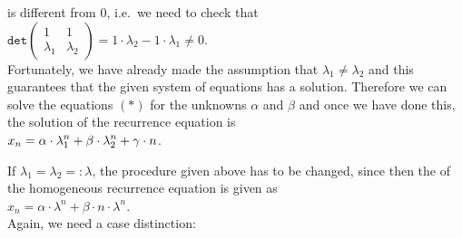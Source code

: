 \begin{enumerate}
\begin{enumerate}
            is different from $0$, i.e.~we need to check that
            \\[0.2cm]
            \hspace*{1.3cm}
            $\texttt{det}\left(
              \begin{array}{cc}
                1         & 1        \\
                \lambda_1 & \lambda_2  
              \end{array}
               \right) = 1 \cdot \lambda_2 - 1 \cdot \lambda_1
            \not= 0$.
            \\[0.2cm]
            Fortunately, we have already made the assumption that $\lambda_1 \not= \lambda_2$ and this
            guarantees that the given system of equations has a solution.
            Therefore we can solve the equations $(*)$ for the unknowns $\alpha$ and $\beta$ and once we have
            done this, the solution of the recurrence equation is
            \\[0.2cm]
            \hspace*{1.3cm}
            $\displaystyle x_{n} = \alpha \cdot \lambda_1^n + \beta \cdot \lambda_2^n + \gamma \cdot n$.
      \end{enumerate}
\end{enumerate}
If $\lambda_1 = \lambda_2 =: \lambda$, the procedure given above has to be changed, since then the
 of the homogeneous recurrence equation is given as
\\[0.2cm]
\hspace*{1.3cm}
$x_n = \alpha \cdot \lambda^n + \beta \cdot n \cdot \lambda^n$.
\\[0.2cm]
Again, we need a case distinction:
